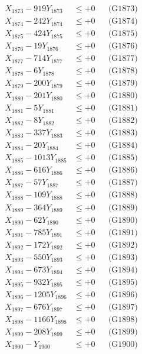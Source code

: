 \documentclass[a4paper,10pt]{article}
\begin{document}
{\begin{align}
X_{1873} - 919Y_{1873} &\leq +0 && \text{(G1873)} \\
X_{1874} - 242Y_{1874} &\leq +0 && \text{(G1874)} \\
X_{1875} - 424Y_{1875} &\leq +0 && \text{(G1875)} \\
X_{1876} - 19Y_{1876} &\leq +0 && \text{(G1876)} \\
X_{1877} - 714Y_{1877} &\leq +0 && \text{(G1877)} \\
X_{1878} - 6Y_{1878} &\leq +0 && \text{(G1878)} \\
X_{1879} - 200Y_{1879} &\leq +0 && \text{(G1879)} \\
X_{1880} - 201Y_{1880} &\leq +0 && \text{(G1880)} \\
\allowbreak
X_{1881} - 5Y_{1881} &\leq +0 && \text{(G1881)} \\
X_{1882} - 8Y_{1882} &\leq +0 && \text{(G1882)} \\
X_{1883} - 337Y_{1883} &\leq +0 && \text{(G1883)} \\
X_{1884} - 20Y_{1884} &\leq +0 && \text{(G1884)} \\
X_{1885} - 1013Y_{1885} &\leq +0 && \text{(G1885)} \\
X_{1886} - 616Y_{1886} &\leq +0 && \text{(G1886)} \\
X_{1887} - 57Y_{1887} &\leq +0 && \text{(G1887)} \\
X_{1888} - 109Y_{1888} &\leq +0 && \text{(G1888)} \\
X_{1889} - 364Y_{1889} &\leq +0 && \text{(G1889)} \\
X_{1890} - 62Y_{1890} &\leq +0 && \text{(G1890)} \\
\allowbreak
X_{1891} - 785Y_{1891} &\leq +0 && \text{(G1891)} \\
X_{1892} - 172Y_{1892} &\leq +0 && \text{(G1892)} \\
X_{1893} - 550Y_{1893} &\leq +0 && \text{(G1893)} \\
X_{1894} - 673Y_{1894} &\leq +0 && \text{(G1894)} \\
X_{1895} - 932Y_{1895} &\leq +0 && \text{(G1895)} \\
X_{1896} - 1205Y_{1896} &\leq +0 && \text{(G1896)} \\
X_{1897} - 676Y_{1897} &\leq +0 && \text{(G1897)} \\
X_{1898} - 1166Y_{1898} &\leq +0 && \text{(G1898)} \\
X_{1899} - 208Y_{1899} &\leq +0 && \text{(G1899)} \\
X_{1900} - Y_{1900} &\leq +0 && \text{(G1900)} \\

\end{align}}
\end{document}
